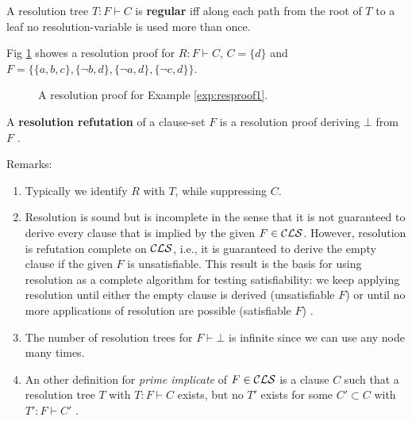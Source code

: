 \documentclass[]{book}
\begin{document}
\begin{defi}\label{def:treg_ree}
   A resolution tree $T : F \vdash C$ is \textbf{regular} iff along each path from the root of $T$ to a leaf 
   no resolution-variable is used more than once. 
\end{defi}
 \begin{examp}\label{exp:resproof1}
      Fig \ref{fig:proof1} showes a resolution proof for  $R: F \vdash C$, $C=\{d\}$ and $F = \{\{a,b,c\},\{\neg b,d\},\{\neg a, d\},\{\neg c, d\}\}$. 
	   \begin{figure}
	   \centering  
	   \caption{A resolution proof for Example \ref{exp:resproof1}.}
	   \label{fig:proof1}
       \end{figure}
\end{examp}

\begin{defi}\label{def:resrefutation}
  A \textbf{resolution refutation} of a clause-set $F$ is a resolution proof deriving $\bot$ from $F$ \cite{h5}. 
\end{defi}
  
Remarks:
\begin{enumerate}
      \item Typically we identify $R$ with $T$, while suppressing $C$.
	  \item Resolution is sound but is incomplete in the sense that it is not guaranteed to derive every clause that is implied by the given $F \in \mathcal{CLS}$. 
	  However, resolution is refutation complete on $\mathcal{CLS}$, i.e., it is guaranteed to derive the empty clause if the given $F$ is unsatisfiable. 
	  This result is the basis for using resolution as a complete algorithm for testing satisfiability: we keep applying resolution until either 
	  the empty clause is derived (unsatisfiable $F$) or until no more applications of resolution are possible (satisfiable $F$) \cite{h6}.
	  \item The number of resolution trees for $F \vdash \bot$ is infinite since we can use any node many times.
	  \item An other definition for \emph{prime implicate} of $F \in \mathcal{CLS}$ is a clause $C$ such that a resolution tree 
	  $T$ with $T: F \vdash C$ exists, but no $T'$ exists for some $C' \subset C$ with $T': F \vdash C'$ \cite{h11}.

\end{enumerate}
\end{document}
